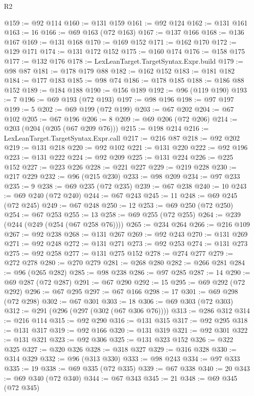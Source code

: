 \begin{lexlean}{R2}
\begin{coremodule}
@159 := @92 @114
@160 := @131 @159
@161 := @92 @124
@162 := @131 @161
@163 := 16
@166 := @69 @163 (@72 @163)
@167 := @137 @166
@168 := @136 @167
@169 := @131 @168
@170 := @169 @152
@171 := @162 @170
@172 := @129 @171
@174 := @131 @172 @152
@175 := @160 @174
@176 := @158 @175
@177 := @132 @176
@178 := LexLeanTarget.TargetSyntax.Expr.build
@179 := @98 @87
@181 := @178 @179 @88
@182 := @162 @152
@183 := @181 @182
@184 := @177 @183
@185 := @98 @74
@186 := @178 @185
@188 := @186 @88 @152
@189 := @184 @188
@190 := @156 @189
@192 := @96 (@119 @190)
@193 := 7
@196 := @69 @193 (@72 @193)
@197 := @98 @196
@198 := @97 @197
@199 := 5
@202 := @69 @199 (@72 @199)
@203 := @67 @202
@204 := @67 @102
@205 := @67 @196
@206 := 8
@209 := @69 @206 (@72 @206)
@214 := @203 (@204 (@205 (@67 @209 @76)))
@215 := @198 @214
@216 := LexLeanTarget.TargetSyntax.Expr.call
@217 := @216 @87
@218 := @92 @202
@219 := @131 @218
@220 := @92 @102
@221 := @131 @220
@222 := @92 @196
@223 := @131 @222
@224 := @92 @209
@225 := @131 @224
@226 := @225 @152
@227 := @223 @226
@228 := @221 @227
@229 := @219 @228
@230 := @217 @229
@232 := @96 (@215 @230)
@233 := @98 @209
@234 := @97 @233
@235 := 9
@238 := @69 @235 (@72 @235)
@239 := @67 @238
@240 := 10
@243 := @69 @240 (@72 @240)
@244 := @67 @243
@245 := 11
@248 := @69 @245 (@72 @245)
@249 := @67 @248
@250 := 12
@253 := @69 @250 (@72 @250)
@254 := @67 @253
@255 := 13
@258 := @69 @255 (@72 @255)
@264 := @239 (@244 (@249 (@254 (@67 @258 @76))))
@265 := @234 @264
@266 := @216 @109
@267 := @92 @238
@268 := @131 @267
@269 := @92 @243
@270 := @131 @269
@271 := @92 @248
@272 := @131 @271
@273 := @92 @253
@274 := @131 @273
@275 := @92 @258
@277 := @131 @275 @152
@278 := @274 @277
@279 := @272 @278
@280 := @270 @279
@281 := @268 @280
@282 := @266 @281
@284 := @96 (@265 @282)
@285 := @98 @238
@286 := @97 @285
@287 := 14
@290 := @69 @287 (@72 @287)
@291 := @67 @290
@292 := 15
@295 := @69 @292 (@72 @292)
@296 := @67 @295
@297 := @67 @166
@298 := 17
@301 := @69 @298 (@72 @298)
@302 := @67 @301
@303 := 18
@306 := @69 @303 (@72 @303)
@312 := @291 (@296 (@297 (@302 (@67 @306 @76))))
@313 := @286 @312
@314 := @216 @114
@315 := @92 @290
@316 := @131 @315
@317 := @92 @295
@318 := @131 @317
@319 := @92 @166
@320 := @131 @319
@321 := @92 @301
@322 := @131 @321
@323 := @92 @306
@325 := @131 @323 @152
@326 := @322 @325
@327 := @320 @326
@328 := @318 @327
@329 := @316 @328
@330 := @314 @329
@332 := @96 (@313 @330)
@333 := @98 @243
@334 := @97 @333
@335 := 19
@338 := @69 @335 (@72 @335)
@339 := @67 @338
@340 := 20
@343 := @69 @340 (@72 @340)
@344 := @67 @343
@345 := 21
@348 := @69 @345 (@72 @345)

\end{coremodule}
\end{lexlean}

